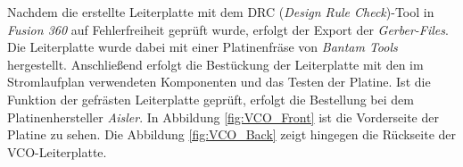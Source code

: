 Nachdem die erstellte Leiterplatte mit dem DRC (\textit{Design Rule Check})-Tool in \textit{Fusion 360} auf Fehlerfreiheit geprüft wurde, erfolgt der Export der \textit{Gerber-Files}.
Die Leiterplatte wurde dabei mit einer Platinenfräse von \textit{Bantam Tools} hergestellt.
Anschließend erfolgt die Bestückung der Leiterplatte mit den im Stromlaufplan verwendeten Komponenten und das Testen der Platine. 
Ist die Funktion der gefrästen Leiterplatte geprüft, erfolgt die Bestellung bei dem Platinenhersteller \textit{Aisler}. 
In Abbildung \ref{fig:VCO_Front} ist die Vorderseite der Platine zu sehen.
Die Abbildung \ref{fig:VCO_Back} zeigt hingegen die Rückseite der VCO-Leiterplatte. 

